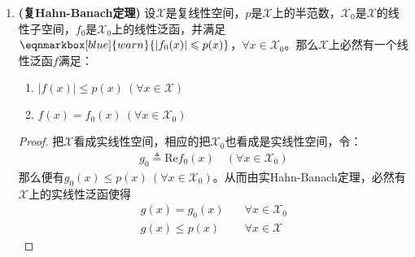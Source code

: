 \begin{enumerate}[leftmargin=2cm, label=\arabic*]
\begin{proof}
于是$\mathscr{F}$成为一个半序集，又设$M$是$\mathscr{F}$中的任一个全序子集，令
\begin{align*}
    \mathscr{X}_M \triangleq \bigcup\limits_{(\mathscr{X}_{\Delta},f_{\Delta})\in M} \{\mathscr{X}_{\Delta}\}
\end{align*}
以及
\begin{align*}
    f_M(x) = f_{\Delta}(x),\quad \forall x\in\mathscr{X}_{\Delta},\ (\mathscr{X}_{\Delta},f_{\Delta})\in M
\end{align*}
由于$M$是全序子集，容易验证$\mathscr{X}$是包含$\mathscr{X}_0$的子空间，且$f_M$在$\mathscr{X}_M$上是唯一确定的，满足$f_M(x)\leqslant p(x)$，于是$(\mathscr{X}_M,f_M)\in\mathscr{F}$并且是$M$的一个上界。由Zorn引理，$\mathscr{F}$本身存在极大元，记为$(\mathscr{X}_A,f_A)$。

最后我们证明$\mathscr{X}_A = \mathscr{X}$，用反证法，若不然则可以构造出$(\Tilde{\mathscr{X}}_A,\Tilde{f}_A)\in\mathscr{F}$，与极大性矛盾。故而所求的$f$即为$f_A$。
    \end{proof}
    \item \textbf{(复Hahn-Banach定理)} 设$\mathscr{X}$是复线性空间，$p$是$\mathscr{X}$上的半范数，$\mathscr{X}_0$是$\mathscr{X}$的线性子空间，$f_0$是$\mathscr{X}_0$上的线性泛函，并满足$\eqnmarkbox[blue]{warn}{|f_0(x)| \leqslant p(x)}$，$\forall x\in \mathscr{X}_0$。那么$\mathscr{X}$上必然有一个线性泛函$f$满足：
    \vspace{1em}
    
    \begin{enumerate}[leftmargin=1cm, label=(\arabic*)]
        \item $|f(x)|\leqslant p(x)\ (\forall x\in\mathscr{X})$
        \item $f(x) = f_0(x)\ (\forall x\in\mathscr{X}_0)$
    \end{enumerate}
    \begin{proof}
        把$\mathscr{X}$看成实线性空间，相应的把$\mathscr{X}_0$也看成是实线性空间，令：
        \begin{align*}
            g_0\triangleq \text{Re} f_0(x) \quad (\forall x\in\mathscr{X}_0)
        \end{align*}
        那么便有$g_0(x)\leqslant p(x)\ (\forall x\in\mathscr{X}_0)$。从而由实Hahn-Banach定理，必然有$\mathscr{X}$上的实线性泛函使得
        \begin{align*}
            g(x) = g_0(x) &\quad \forall x\in\mathscr{X}_0 \\
            g(x) \leqslant p(x) &\quad \forall x\in\mathscr{X}
        \end{align*}


\end{proof}
\end{enumerate}
